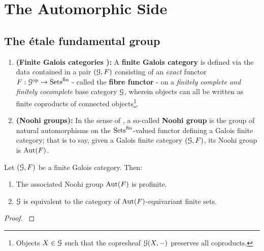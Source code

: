 \section{The Automorphic Side}
    \subsection{The \'etale fundamental group}
        \begin{definition} \label{def: finite_galois_categories}
            \noindent
            \begin{enumerate}
                \item \textbf{(Finite Galois categories \cite[\href{https://stacks.math.columbia.edu/tag/0BMY}{Tag 0BMY}]{stacks}):} A \textbf{finite Galois category} is defined via the data contained in a pair $(\mathcal{G}, F)$ consisting of an \textit{exact} functor $F: \mathcal{G}^{\mathrm{op}} \to \mathrm{Sets}^{\mathrm{fin}}$ - called the \textbf{fibre functor} - on a \textit{finitely complete and finitely cocomplete} base category $\mathcal{G}$, wherein objects can all be written as finite coproducts of connected objects\footnote{Objects $X \in \mathcal{G}$ such that the copresheaf $\mathcal{G}(X, -)$ preserves all coproducts.}.
                \item \textbf{(Noohi groups):} In the sense of \cite[Theorem 2.16]{noohi_fundamental_group}, a so-called \textbf{Noohi group} is the group of natural automorphisms on the $\mathrm{Sets}^{\mathrm{fin}}$-valued functor defining a Galois finite category; that is to say, given a Galois finite category $(\mathcal{G}, F)$, its Noohi group is $\mathrm{Aut}(F)$.  
            \end{enumerate}
        \end{definition}
        
        \begin{lemma} \label{lemma: profiniteness_of_noohi_groups}
            Let $(\mathcal{G}, F)$ be a finite Galois category. Then:
                \begin{enumerate}
                    \item The associated Noohi group $\mathrm{Aut}(F)$ is profinite.
                    \item $\mathcal{G}$ is equivalent to the category of $\mathrm{Aut}(F)$-equivariant finite sets.
                \end{enumerate}
        \end{lemma}
            \begin{proof}
                \cite[Theorem 2.16]{noohi_fundamental_group}
            \end{proof}
        
